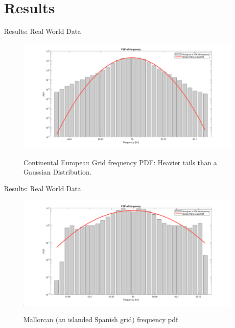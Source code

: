 \section[Results]{Results}
\label{sec:results}

\begin{frame}{Results: Real World Data}
	\begin{figure}
		\centering
		\includegraphics[scale=0.15]{../figures/pdf/pdf_frequency_rte_2019_09.png}
		\label{fig:pdf_rte2019}
		\caption{Continental European Grid frequency PDF: Heavier tails than a Gaussian Distribution.}
	\end{figure}
\end{frame}

\begin{frame}{Results: Real World Data}
	\begin{figure}
		\centering
		\includegraphics[scale=0.15]{../figures/pdf/pdf_frequency_spain_mallorca_2019_05_f1}
		\label{fig:pdf_spainMallorca}
		\caption{Mallorcan (an islanded Spanish grid) frequency pdf}
	\end{figure}
\end{frame}

